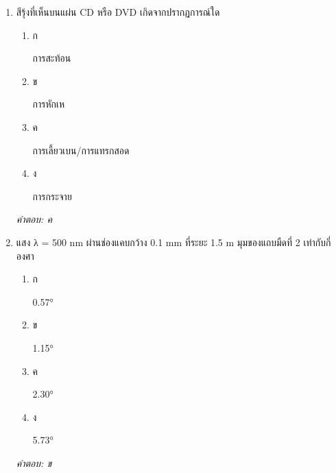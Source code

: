 \documentclass[12pt]{article}
\begin{document}
\begin{enumerate}[label=\arabic*., itemsep=0.5\baselineskip, topsep=0.5\baselineskip, leftmargin=*]
\item สีรุ้งที่เห็นบนแผ่น CD หรือ DVD เกิดจากปรากฏการณ์ใด
\begin{enumerate}[label=\alph*)., itemsep=0.3\baselineskip, topsep=0.3\baselineskip]
\item ก\ 
\begin{minipage}[t]{0.9\linewidth}
\raggedright การสะท้อน
\end{minipage}
\item ข\ 
\begin{minipage}[t]{0.9\linewidth}
\raggedright การหักเห
\end{minipage}
\item ค\ 
\begin{minipage}[t]{0.9\linewidth}
\raggedright การเลี้ยวเบน/การแทรกสอด
\end{minipage}
\item ง\ 
\begin{minipage}[t]{0.9\linewidth}
\raggedright การกระจาย
\end{minipage}
\end{enumerate}
\vspace{-0.3\baselineskip}
\begin{small}
\textit{คำตอบ: ค}
\end{small}

\item แสง λ = 500 nm ผ่านช่องแคบกว้าง 0.1 mm ที่ระยะ 1.5 m มุมของแถบมืดที่ 2 เท่ากับกี่องศา
\begin{enumerate}[label=\alph*)., itemsep=0.3\baselineskip, topsep=0.3\baselineskip]
\item ก\ 
\begin{minipage}[t]{0.9\linewidth}
\raggedright 0.57°
\end{minipage}
\item ข\ 
\begin{minipage}[t]{0.9\linewidth}
\raggedright 1.15°
\end{minipage}
\item ค\ 
\begin{minipage}[t]{0.9\linewidth}
\raggedright 2.30°
\end{minipage}
\item ง\ 
\begin{minipage}[t]{0.9\linewidth}
\raggedright 5.73°
\end{minipage}
\end{enumerate}
\vspace{-0.3\baselineskip}
\begin{small}
\textit{คำตอบ: ข}
\end{small}

\end{enumerate}
\end{document}
